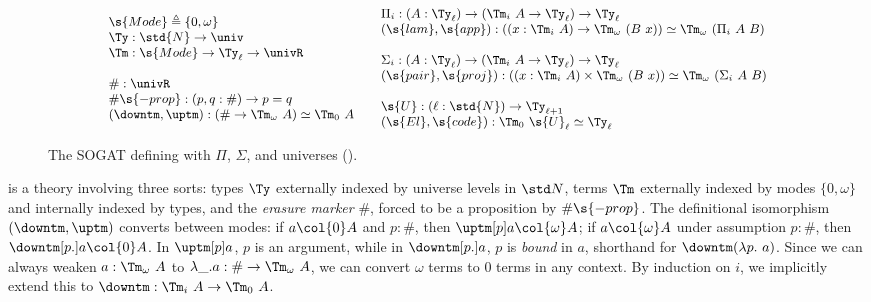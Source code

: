 \begin{figure}[h]
\centering
\[\small\begin{array}{l}
  \s{Mode} \triangleq \{0, \omega\} \\
  \Ty : \std{N} \to \univ \\
  \Tm : \s{Mode} \to \Ty_\ell \to \univR \\
  \\
  \# : \univR \\
  \#\s{-prop} : (p, q : \#) \to p = q \\
  (\downtm, \uptm) : (\# \to \Tm_\omega\ A) \simeq \Tm_0\ A
\end{array}
\quad
\begin{array}{l}
  \Pi_i : (A : \Ty_\ell) \to (\Tm_i\ A \to \Ty_\ell) \to \Ty_\ell \\
  (\s{lam}, \s{app}) : ((x : \Tm_i\ A) \to \Tm_\omega\ (B\ x)) \simeq \Tm_\omega\ (\Pi_i\ A\ B) \\
  \\
  \Sigma_i : (A : \Ty_\ell) \to (\Tm_i\ A \to \Ty_\ell) \to \Ty_\ell \\
  (\s{pair}, \s{proj}) : ((x : \Tm_i\ A) \times \Tm_\omega\ (B\ x)) \simeq \Tm_\omega\ (\Sigma_i\ A\ B) \\
  \\
  \s{U} : (\ell : \std{N}) \to \Ty_{\ell + 1} \\
  (\s{El}, \s{code}) : \Tm_0\ \s{U}_\ell \simeq \Ty_\ell
\end{array}\]
\caption{The SOGAT defining \ZTT with $\Pi$, $\Sigma$, and universes ().}
\label{fig:tt0-sogat}
\end{figure}

\ZTT is a theory involving three sorts: types $\Ty$ externally indexed by
universe levels in $\std N$, terms $\Tm$ externally indexed by modes $\{0, \omega\}$ and
internally indexed by types, and the \emph{erasure marker} $\#$, forced to be a
proposition by $\#\s{-prop}$. The definitional isomorphism $(\downtm, \uptm)$
converts between modes: if $a \col{0} A$ and $p : \#$, then $\uptm[p] a
\col{\omega} A$; if $a \col{\omega} A$ under assumption $p: \#$, then
$\downtm[p.] a \col{0} A$. In $\uptm[p] a$, $p$ is an argument, while in
$\downtm[p.] a$, $p$ is \emph{bound} in $a$, shorthand for $\downtm (\lambda p.\
a)$. Since we can always weaken $a : \Tm_\omega\ A$ to $\lambda\_.a : \# \to
\Tm_\omega\ A$, we can convert $\omega$ terms to 0 terms in any context. By
induction on $i$, we implicitly extend this to $\downtm : \Tm_i\ A \to \Tm_0\
A$.

